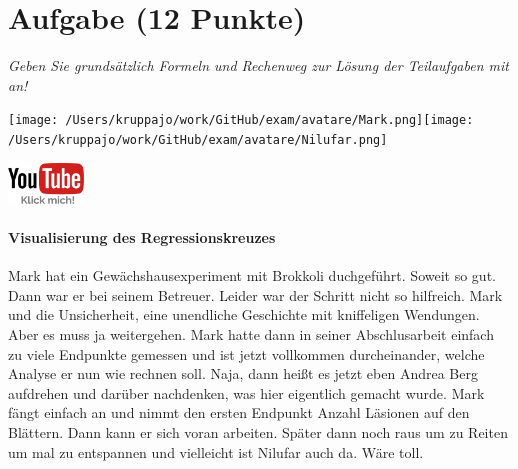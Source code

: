 \documentclass[a4paper, 9pt]{scrartcl}\usepackage[]{graphicx}\usepackage[]{xcolor}
\begin{document}
\clearpage

\section{Aufgabe \hfill (12 Punkte)}

\textit{Geben Sie grundsätzlich Formeln und Rechenweg zur Lösung der Teilaufgaben mit an!} \\[1Ex]
 

 
\begin{minipage}[t]{0.5\textwidth}
\texttt{[image: /Users/kruppajo/work/GitHub/exam/avatare/Mark.png]}\hspace{-4mm}\texttt{[image: /Users/kruppajo/work/GitHub/exam/avatare/Nilufar.png]}
\end{minipage}
\begin{minipage}[t]{0.5\textwidth}
\hfill
\href{https://youtu.be/kHmfEmU6lrk}{\includegraphics[width = 2cm]{img/youtube}}
\end{minipage}



\paragraph{Visualisierung des Regressionskreuzes}

Mark hat ein Gewächshausexperiment mit Brokkoli duchgeführt. Soweit so gut. Dann war er bei seinem Betreuer. Leider war der Schritt nicht so hilfreich.  Mark und die Unsicherheit, eine unendliche Geschichte mit kniffeligen Wendungen. Aber es muss ja weitergehen. Mark hatte dann in seiner Abschlusarbeit einfach zu viele Endpunkte gemessen und ist jetzt vollkommen durcheinander, welche Analyse er nun wie rechnen soll. Naja, dann heißt es jetzt eben Andrea Berg aufdrehen und darüber nachdenken, was hier eigentlich gemacht wurde. Mark fängt einfach an und nimmt den ersten Endpunkt Anzahl Läsionen auf den Blättern. Dann kann er sich voran arbeiten. Später dann noch raus um zu Reiten um mal zu entspannen und vielleicht ist Nilufar auch da. Wäre toll.

\vspace{1Ex}
\end{document}

